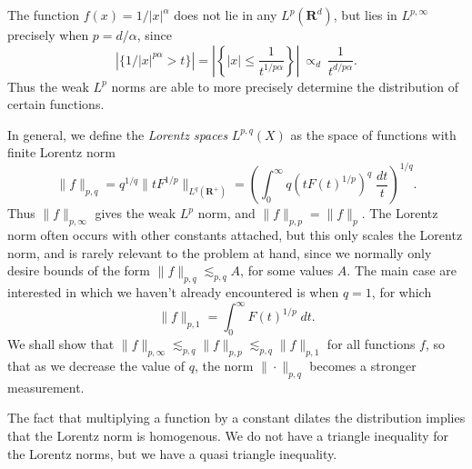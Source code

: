 \begin{example}
    The function $f(x) = 1/|x|^\alpha$ does not lie in any $L^p(\mathbf{R}^d)$, but lies in $L^{p,\infty}$ precisely when $p = d/\alpha$, since
    \[ \left| \{ 1/|x|^{p\alpha} > t \} \right| = \left| \left\{ |x| \leq \frac{1}{t^{1/p\alpha}} \right\} \right|\ \propto_d\ \frac{1}{t^{d/p\alpha}}. \]
    Thus the weak $L^p$ norms are able to more precisely determine the distribution of certain functions.
\end{example}

In general, we define the \emph{Lorentz spaces} $L^{p,q}(X)$ as the space of functions with finite Lorentz norm
%
\[ \| f \|_{p,q} = q^{1/q} \| t F^{1/p} \|_{L^q(\mathbf{R}^+)} = \left( \int_0^\infty q (tF(t)^{1/p})^q\; \frac{dt}{t} \right)^{1/q}. \]
%
Thus $\| f \|_{p,\infty}$ gives the weak $L^p$ norm, and $\| f \|_{p,p} = \| f \|_p$. The Lorentz norm often occurs with other constants attached, but this only scales the Lorentz norm, and is rarely relevant to the problem at hand, since we normally only desire bounds of the form $\| f \|_{p,q} \lesssim_{p,q} A$, for some values $A$. The main case are interested in which we haven't already encountered is when $q = 1$, for which
%
\[ \| f \|_{p,1} = \int_0^\infty F(t)^{1/p}\; dt. \]
%
We shall show that $\| f \|_{p,\infty} \lesssim_{p,q} \| f \|_{p,p} \lesssim_{p,q} \| f \|_{p,1}$ for all functions $f$, so that as we decrease the value of $q$, the norm $\| \cdot \|_{p,q}$ becomes a stronger measurement.

The fact that multiplying a function by a constant dilates the distribution implies that the Lorentz norm is homogenous. We do not have a triangle inequality for the Lorentz norms, but we have a quasi triangle inequality.


